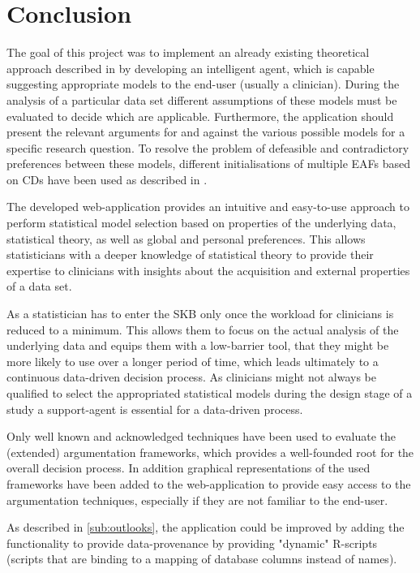 \section{Conclusion}
\label{sec:conclusion}
The goal of this project was to implement an already existing theoretical approach described in \cite{sassoon2016, sassoon2014, sassoon2016CD} by developing an intelligent agent, which is capable suggesting appropriate models to the end-user (usually a clinician). During the analysis of a particular data set different assumptions of these models must be evaluated to decide which are applicable. Furthermore, the application should present the relevant arguments for and against the various possible models  for a specific research question. To resolve the problem of defeasible and contradictory preferences between these models, different initialisations of multiple \glspl{EAF} based on \glspl{CD} have been used as described in \cite{sassoon2016, sassoon2016CD}.

The developed web-application provides an intuitive and easy-to-use approach to perform statistical model selection based on properties of the underlying data, statistical theory, as well as global and personal preferences. This allows statisticians with a deeper knowledge of statistical theory to provide their expertise to clinicians with insights about the acquisition and external properties of a data set. 

As a statistician has to enter the \gls{SKB} only once the workload for clinicians is reduced to a minimum. This allows them to focus on the actual analysis of the underlying data and equips them with a low-barrier tool, that they might be more likely to use over a longer period of time, which leads ultimately to a continuous data-driven decision process. As clinicians might not always be qualified to select the appropriated statistical models during the design stage of a study \cite{sassoon2014} a support-agent is essential for a data-driven process.

Only well known and acknowledged techniques have been used to evaluate the (extended) argumentation frameworks, which provides a well-founded root for the overall decision process. In addition graphical representations of the used frameworks have been added to the web-application to provide easy access to the argumentation techniques, especially if they are not familiar to the end-user.

As described in \autoref{sub:outlooks}, the application could be improved by adding the functionality to provide data-provenance by providing "dynamic" \gls{R}-scripts (scripts that are binding to a mapping of database columns instead of names). 

